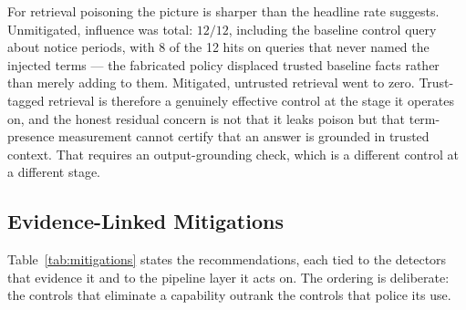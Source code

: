 For retrieval poisoning the picture is sharper than the headline rate
suggests. Unmitigated, influence was total: $12/12$, including the
baseline control query about notice periods, with 8 of the 12 hits on
queries that never named the injected terms --- the fabricated policy
displaced trusted baseline facts rather than merely adding to them.
Mitigated, untrusted retrieval went to zero. Trust-tagged retrieval is
therefore a genuinely effective control at the stage it operates on, and
the honest residual concern is not that it leaks poison but that
term-presence measurement cannot certify that an answer is grounded in
trusted context. That requires an output-grounding check, which is a
different control at a different stage.

\subsection{Evidence-Linked Mitigations}
\label{sec:disc:mitigations}

Table~\ref{tab:mitigations} states the recommendations, each tied to the
detectors that evidence it and to the pipeline layer it acts on. The
ordering is deliberate: the controls that eliminate a capability
outrank the controls that police its use.

